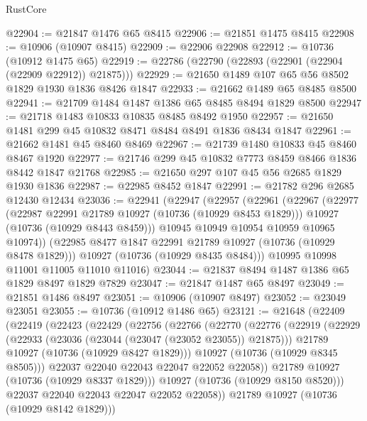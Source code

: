 \begin{lexlean}{RustCore}
\begin{coremodule}
@22904 := @21847 @1476 @65 @8415
@22906 := @21851 @1475 @8415
@22908 := @10906 (@10907 @8415)
@22909 := @22906 @22908
@22912 := @10736 (@10912 @1475 @65)
@22919 := @22786 (@22790 (@22893 (@22901 (@22904 (@22909 @22912)) @21875)))
@22929 := @21650 @1489 @107 @65 @56 @8502 @1829 @1930 @1836 @8426 @1847
@22933 := @21662 @1489 @65 @8485 @8500
@22941 := @21709 @1484 @1487 @1386 @65 @8485 @8494 @1829 @8500
@22947 := @21718 @1483 @10833 @10835 @8485 @8492 @1950
@22957 := @21650 @1481 @299 @45 @10832 @8471 @8484 @8491 @1836 @8434 @1847
@22961 := @21662 @1481 @45 @8460 @8469
@22967 := @21739 @1480 @10833 @45 @8460 @8467 @1920
@22977 := @21746 @299 @45 @10832 @7773 @8459 @8466 @1836 @8442 @1847 @21768
@22985 := @21650 @297 @107 @45 @56 @2685 @1829 @1930 @1836
@22987 := @22985 @8452 @1847
@22991 := @21782 @296 @2685 @12430 @12434
@23036 := @22941
    (@22947
      (@22957
        (@22961
          (@22967
            (@22977
              (@22987 @22991 @21789 @10927 (@10736 (@10929 @8453 @1829)))
              @10927
              (@10736 (@10929 @8443 @8459)))
            @10945
            @10949
            @10954
            @10959
            @10965
            @10974))
        (@22985 @8477 @1847 @22991 @21789 @10927 (@10736 (@10929 @8478 @1829)))
        @10927
        (@10736 (@10929 @8435 @8484)))
      @10995
      @10998
      @11001
      @11005
      @11010
      @11016)
@23044 := @21837 @8494 @1487 @1386 @65 @1829 @8497 @1829 @7829
@23047 := @21847 @1487 @65 @8497
@23049 := @21851 @1486 @8497
@23051 := @10906 (@10907 @8497)
@23052 := @23049 @23051
@23055 := @10736 (@10912 @1486 @65)
@23121 := @21648
    (@22409
      (@22419
        (@22423
          (@22429
            (@22756
              (@22766
                (@22770
                  (@22776
                    (@22919
                      (@22929
                        (@22933 (@23036 (@23044 (@23047 (@23052 @23055)) @21875)))
                        @21789
                        @10927
                        (@10736 (@10929 @8427 @1829)))
                      @10927
                      (@10736 (@10929 @8345 @8505)))
                    @22037
                    @22040
                    @22043
                    @22047
                    @22052
                    @22058))
                @21789
                @10927
                (@10736 (@10929 @8337 @1829)))
              @10927
              (@10736 (@10929 @8150 @8520)))
            @22037
            @22040
            @22043
            @22047
            @22052
            @22058))
        @21789
        @10927
        (@10736 (@10929 @8142 @1829)))

\end{coremodule}
\end{lexlean}

